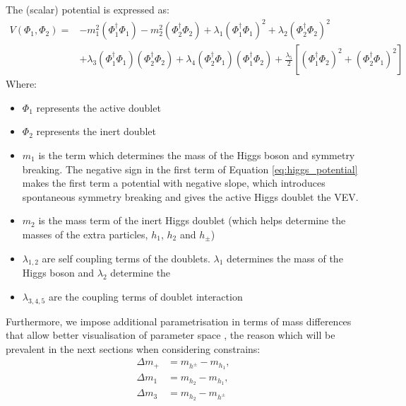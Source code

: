 \documentclass[12pt]{article}
\begin{document}
The (scalar) potential is expressed as:
\begin{equation}
    \begin{split}
        V(\Phi_1, \Phi_2) =& -m_1^2(\Phi_1^\dagger\Phi_1) - m_2^2(\Phi_2^\dagger\Phi_2) + \lambda_1(\Phi_1^\dagger\Phi_1)^2 + \lambda_2(\Phi_2^\dagger\Phi_2)^2 \\
        &+ \lambda_3(\Phi_1^\dagger\Phi_1)(\Phi_2^\dagger\Phi_2) + \lambda_4(\Phi_2^\dagger\Phi_1)(\Phi_1^\dagger\Phi_2) + \frac{\lambda_5}{2}[(\Phi_1^\dagger\Phi_2)^2 + (\Phi_2^\dagger\Phi_1)^2]
        \end{split}
        \label{eq:higgs_potential}
\end{equation}
Where:
\begin{itemize}
    \item $\Phi_1$ represents the active doublet
    \item $\Phi_2$ represents the inert doublet
    \item $m_1$ is the term which determines the mass of the Higgs boson and symmetry breaking. The negative sign in the first term of Equation \ref{eq:higgs_potential} makes the first term a potential with negative slope, which introduces spontaneous symmetry breaking and gives the active Higgs doublet the VEV.
    \item $m_2$ is the mass term of the inert Higgs doublet (which helps determine the masses of the extra particles, $h_1$, $h_2$ and $h_\pm$)
    \item $\lambda_{1, 2}$ are self coupling terms of the doublets. $\lambda_1$ determines the mass of the Higgs boson and $\lambda_2$ determine the 
    \item $\lambda_{3, 4, 5}$ are the coupling terms of doublet interaction
\end{itemize}
Furthermore, we impose additional parametrisation in terms of mass differences that allow better visualisation of parameter space \cite{Belyaev_2022}, the reason which will be prevalent in the next sections when considering constrains:
\begin{equation}
    \begin{split}
        \Delta m_+ &= m_{h^\pm} - m_{h_1},\\
        \Delta m_1 &= m_{h_2} - m_{h_1},\\
        \Delta m_3 &= m_{h_2} - m_{h^\pm}
    \end{split}
    \label{eq:mass_diff_1}
\end{equation}
\end{document}
